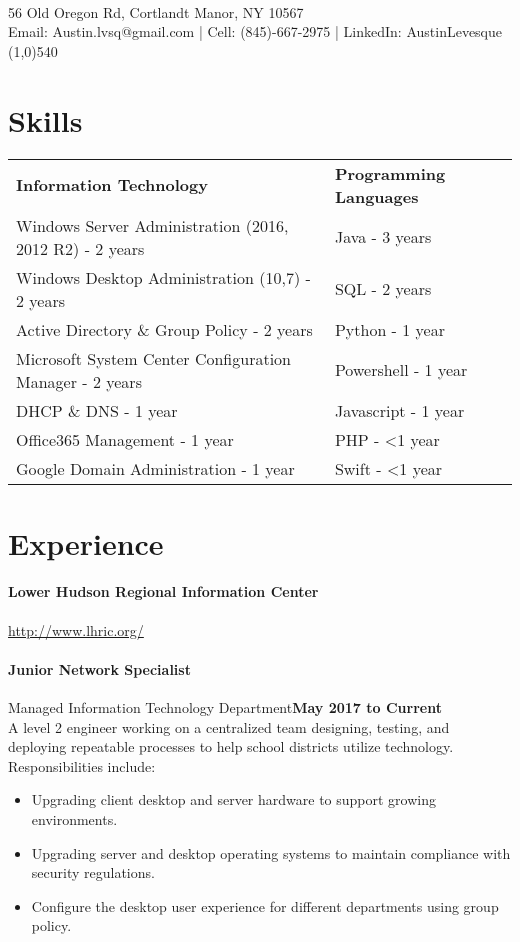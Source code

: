 \documentclass[10pt]{article}
\begin{document}
\begin{center}
\\
56 Old Oregon Rd, Cortlandt Manor, NY 10567\\
Email: Austin.lvsq@gmail.com | Cell: (845)-667-2975 | LinkedIn: AustinLevesque
\line(1,0){540}
\end{center}
\section*{\large Skills}
\begin{tabu}{@{}X[4] @{}X[2]}%
\bf Information Technology & \bf Programming Languages \\
Windows Server Administration (2016, 2012 R2) - 2 years & Java - 3 years\\
Windows Desktop Administration (10,7) - 2 years & SQL - 2 years\\
Active Directory \& Group Policy - 2 years & Python - 1 year\\
Microsoft System Center Configuration Manager - 2 years & Powershell - 1 year\\
DHCP \& DNS - 1 year & Javascript - 1 year\\
Office365 Management - 1 year & PHP - \textless 1 year \\
Google Domain Administration - 1 year & Swift - \textless 1 year
\end{tabu}
\section*{\large Experience}
\paragraph{{\bf Lower Hudson Regional Information Center}}\hfill{\underline {http://www.lhric.org/}~~~}
\paragraph{\bf Junior Network Specialist} {Managed Information Technology Department}\hfill {\bf May 2017 to Current}\\
A level 2 engineer working on a centralized team designing, testing, and deploying repeatable processes to help school districts utilize technology. Responsibilities include:
\begin{itemize}
  \setlength\itemsep{-0.25em}
  \item Upgrading client desktop and server hardware to support growing environments.
  \item Upgrading server and desktop operating systems to maintain compliance with security regulations.
  \item Configure the desktop user experience for different departments using group policy.
\end{itemize}
\end{document}
